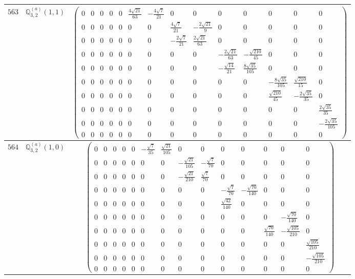 \documentclass[fleqn,8pt,landscape]{jsarticle}
\begin{document}
\begin{center}
\begin{longtable}{ccc}
$ 563 $ & $ \mathbb{Q}_{3,2}^{(a)}(1,1) $ & $ \begin{pmatrix} 0 & 0 & 0 & 0 & 0 & \frac{4 \sqrt{21}}{63} & - \frac{4 \sqrt{7}}{21} & 0 & 0 & 0 & 0 & 0 & 0 & 0 \\ 0 & 0 & 0 & 0 & 0 & 0 & 0 & \frac{4 \sqrt{7}}{21} & - \frac{2 \sqrt{21}}{9} & 0 & 0 & 0 & 0 & 0 \\ 0 & 0 & 0 & 0 & 0 & 0 & 0 & - \frac{2 \sqrt{7}}{21} & \frac{2 \sqrt{21}}{63} & 0 & 0 & 0 & 0 & 0 \\ 0 & 0 & 0 & 0 & 0 & 0 & 0 & 0 & 0 & - \frac{2 \sqrt{21}}{63} & - \frac{\sqrt{210}}{45} & 0 & 0 & 0 \\ 0 & 0 & 0 & 0 & 0 & 0 & 0 & 0 & 0 & - \frac{\sqrt{14}}{21} & \frac{8 \sqrt{35}}{105} & 0 & 0 & 0 \\ 0 & 0 & 0 & 0 & 0 & 0 & 0 & 0 & 0 & 0 & 0 & - \frac{8 \sqrt{35}}{105} & \frac{\sqrt{210}}{15} & 0 \\ 0 & 0 & 0 & 0 & 0 & 0 & 0 & 0 & 0 & 0 & 0 & \frac{\sqrt{210}}{45} & - \frac{2 \sqrt{35}}{35} & 0 \\ 0 & 0 & 0 & 0 & 0 & 0 & 0 & 0 & 0 & 0 & 0 & 0 & 0 & \frac{2 \sqrt{35}}{35} \\ 0 & 0 & 0 & 0 & 0 & 0 & 0 & 0 & 0 & 0 & 0 & 0 & 0 & - \frac{2 \sqrt{35}}{105} \\ 0 & 0 & 0 & 0 & 0 & 0 & 0 & 0 & 0 & 0 & 0 & 0 & 0 & 0 \end{pmatrix} $ \\ \hline
$ 564 $ & $ \mathbb{Q}_{3,2}^{(a)}(1,0) $ & $ \begin{pmatrix} 0 & 0 & 0 & 0 & 0 & - \frac{\sqrt{7}}{35} & \frac{\sqrt{21}}{105} & 0 & 0 & 0 & 0 & 0 & 0 & 0 \\ 0 & 0 & 0 & 0 & 0 & 0 & 0 & - \frac{\sqrt{21}}{105} & - \frac{\sqrt{7}}{70} & 0 & 0 & 0 & 0 & 0 \\ 0 & 0 & 0 & 0 & 0 & 0 & 0 & - \frac{\sqrt{21}}{210} & \frac{\sqrt{7}}{70} & 0 & 0 & 0 & 0 & 0 \\ 0 & 0 & 0 & 0 & 0 & 0 & 0 & 0 & 0 & - \frac{\sqrt{7}}{70} & - \frac{\sqrt{70}}{140} & 0 & 0 & 0 \\ 0 & 0 & 0 & 0 & 0 & 0 & 0 & 0 & 0 & \frac{\sqrt{42}}{140} & 0 & 0 & 0 & 0 \\ 0 & 0 & 0 & 0 & 0 & 0 & 0 & 0 & 0 & 0 & 0 & 0 & - \frac{\sqrt{70}}{140} & 0 \\ 0 & 0 & 0 & 0 & 0 & 0 & 0 & 0 & 0 & 0 & 0 & \frac{\sqrt{70}}{140} & - \frac{\sqrt{105}}{210} & 0 \\ 0 & 0 & 0 & 0 & 0 & 0 & 0 & 0 & 0 & 0 & 0 & 0 & 0 & \frac{\sqrt{105}}{210} \\ 0 & 0 & 0 & 0 & 0 & 0 & 0 & 0 & 0 & 0 & 0 & 0 & 0 & - \frac{\sqrt{105}}{210} \\ 0 & 0 & 0 & 0 & 0 & 0 & 0 & 0 & 0 & 0 & 0 & 0 & 0 & 0 \end{pmatrix} $ \\ \hline

\end{longtable}
\end{center}
\end{document}
